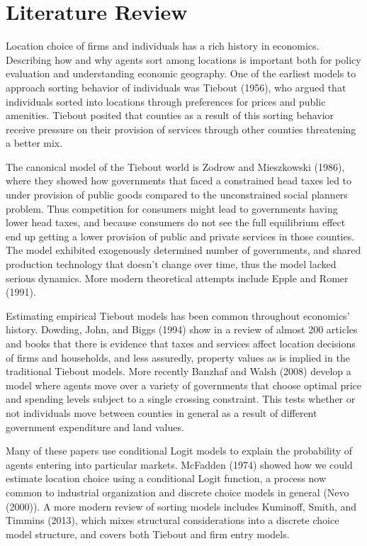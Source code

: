 
\section{Literature Review}

Location choice of firms and individuals has a rich history in economics. Describing how and why agents sort among locations is important both for policy evaluation and understanding economic geography. One of the earliest models to approach sorting behavior of individuals was Tiebout (1956), who argued that individuals sorted into locations through preferences for prices and public amenities. Tiebout posited that counties as a result of this sorting behavior receive pressure on their provision of services through other counties threatening a better mix.

The canonical model of the Tiebout world is Zodrow and Mieszkowski (1986), where they showed how governments that faced a constrained head taxes led to under provision of public goods compared to the unconstrained social planners problem. Thus competition for consumers might lead to governments having lower head taxes, and because consumers do not see the full equilibrium effect end up getting a lower provision of public and private services in those counties. The model exhibited exogenously determined number of governments, and shared production technology that doesn't change over time, thus the model lacked serious dynamics. More modern theoretical attempts include Epple and Romer (1991).

Estimating empirical Tiebout models has been common throughout economics' history. Dowding, John, and Biggs (1994) show in a review of almost 200 articles and books that there is evidence that taxes and services affect location decisions of firms and households, and less assuredly, property values as is implied in the traditional Tiebout models. More recently Banzhaf and Walsh (2008) develop a model where agents move over a variety of governments that choose optimal price and spending levels subject to a single crossing constraint. This tests whether or not individuals move between counties in general as a result of different government expenditure and land values. 

Many of these papers use conditional Logit models to explain the probability of agents entering into particular markets.  McFadden (1974) showed how we could estimate location choice using a conditional Logit function, a process now common to industrial organization and discrete choice models in general (Nevo (2000)).  A more modern review of sorting models includes Kuminoff, Smith, and Timmins (2013), which mixes structural considerations into a discrete choice model structure, and covers both Tiebout and firm entry models.

